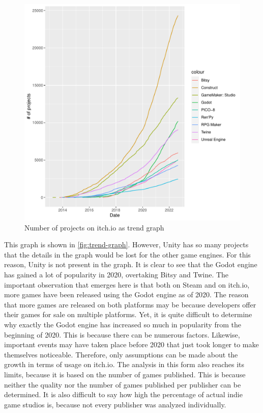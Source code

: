 \begin{figure}[h!]
    \begin{center}
        \includegraphics[width=1.3\columnwidth]{figures/trend-graph.pdf}
        \caption{\label{fig:trend-graph} Number of projects on itch.io as trend graph}
    \end{center}
\end{figure}

This graph is shown in \autoref{fig:trend-graph}.
However, Unity has so many projects that the details in the graph would be lost for the other game engines.
For this reason, Unity is not present in the graph.
It is clear to see that the Godot engine has gained a lot of popularity in 2020, overtaking Bitsy and Twine.
The important observation that emerges here is that both on Steam and on itch.io, more games have been released using the Godot engine as of 2020.
The reason that more games are released on both platforms may be because developers offer their games for sale on multiple platforms.
Yet, it is quite difficult to determine why exactly the Godot engine has increased so much in popularity from the beginning of 2020.
This is because there can be numerous factors.
Likewise, important events may have taken place before 2020 that just took longer to make themselves noticeable.
Therefore, only assumptions can be made about the growth in terms of usage on itch.io.
The analysis in this form also reaches its limits, because it is based on the number of games published.
This is because neither the quality nor the number of games published per publisher can be determined.
It is also difficult to say how high the percentage of actual indie game studios is, because not every publisher was analyzed individually.\\

